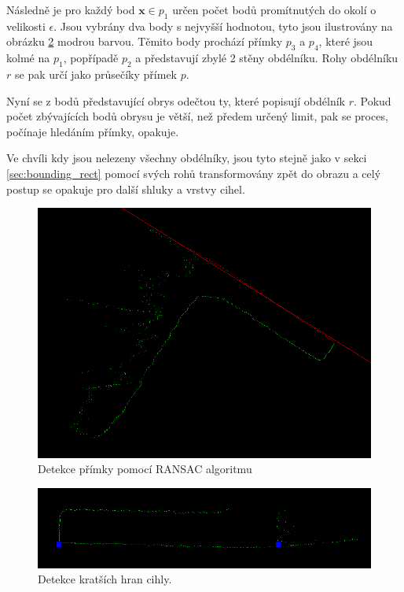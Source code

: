 \documentclass[twoside]{ctuthesis}
\begin{document}
Následně je pro každý bod $\mathbf{x} \in p_1$ určen počet bodů promítnutých do okolí o velikosti $\epsilon$. Jsou vybrány dva body s nejvyšší hodnotou, tyto jsou ilustrovány na obrázku \ref{fig:RANSAC_line_short} modrou barvou. Těmito body prochází přímky $p_3$ a $p_4$, které jsou kolmé na $p_1$, popřípadě $p_2$ a představují zbylé 2 stěny obdélníku. Rohy obdélníku $r$ se pak určí jako průsečíky přímek $p$.

Nyní se z bodů představující obrys odečtou ty, které popisují obdélník $r$. Pokud počet zbývajících bodů obrysu je větší, než předem určený limit, pak se proces, počínaje hledáním přímky, opakuje.

Ve chvíli kdy jsou nelezeny všechny obdélníky, jsou tyto stejně jako v sekci \ref{sec:bounding_rect} pomocí svých rohů transformovány zpět do obrazu a celý postup se opakuje pro další shluky a vrstvy cihel.




\begin{figure}
    \centering
    \includegraphics[width = \linewidth]{pictures/ransac_rect_fit1.png}
    \caption{Detekce přímky pomocí RANSAC algoritmu}
    \label{fig:RANSAC_line}
\end{figure}

\begin{figure}
    \centering
    \includegraphics[width = \linewidth]{pictures/crop_ransac_rot.png}
    \caption{Detekce kratších hran cihly.}
    \label{fig:RANSAC_line_short}
\end{figure}
\end{document}
